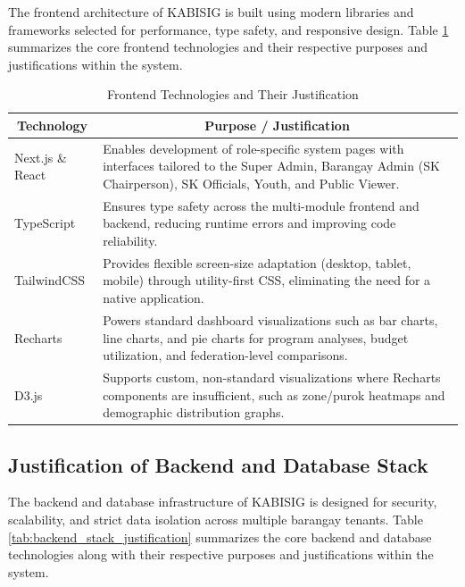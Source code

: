 \hspace*{\parindent}The frontend architecture of KABISIG is built using modern libraries and frameworks selected for performance, type safety, and responsive design. Table \ref{tab:frontend_stack_justification} summarizes the core frontend technologies and their respective purposes and justifications within the system.

\begin{table}[H]
\centering
\caption{Frontend Technologies and Their Justification}
\label{tab:frontend_stack_justification}
\begin{tabular}{|l|p{8.5cm}|}
\hline
\multicolumn{1}{|c|}{\textbf{Technology}} & \multicolumn{1}{c|}{\textbf{Purpose / Justification}} \\ \hline
Next.js \& React & Enables development of role-specific system pages with interfaces tailored to the Super Admin, Barangay Admin (SK Chairperson), SK Officials, Youth, and Public Viewer. \\ \hline
TypeScript & Ensures type safety across the multi-module frontend and backend, reducing runtime errors and improving code reliability. \\ \hline
TailwindCSS & Provides flexible screen-size adaptation (desktop, tablet, mobile) through utility-first CSS, eliminating the need for a native application. \\ \hline
Recharts & Powers standard dashboard visualizations such as bar charts, line charts, and pie charts for program analyses, budget utilization, and federation-level comparisons. \\ \hline
D3.js & Supports custom, non-standard visualizations where Recharts components are insufficient, such as zone/purok heatmaps and demographic distribution graphs. \\ \hline
\end{tabular}
\end{table}
\vspace{5mm}
\newpage

\subsection{Justification of Backend and Database Stack}
\label{subsec:justification_of_backend_and_database_stack}

\hspace*{\parindent}The backend and database infrastructure of KABISIG is designed for security, scalability, and strict data isolation across multiple barangay tenants. Table \ref{tab:backend_stack_justification} summarizes the core backend and database technologies along with their respective purposes and justifications within the system.

